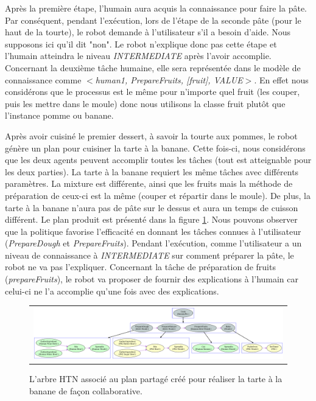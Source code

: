 \documentclass[a4paper,11pt,twoside]{StyleThese}
\begin{document}
Après la première étape, l'humain aura acquis la connaissance pour faire la pâte. Par conséquent, pendant l'exécution, lors de l'étape de la seconde pâte (pour le haut de la tourte), le robot demande à l'utilisateur s'il a besoin d'aide. Nous supposons ici qu'il dit "non". Le robot n'explique donc pas cette étape et l'humain atteindra le niveau \textit{INTERMEDIATE} après l'avoir accomplie. Concernant la deuxième tâche humaine, elle sera représentée dans le modèle de connaissance comme \textit{$<$human1, PrepareFruits, [fruit], VALUE$>$}. En effet nous considérons que le processus est le même pour n'importe quel fruit (les couper, puis les mettre dans le moule) donc nous utilisons la classe fruit plutôt que l'instance pomme ou banane.
%
%

Après avoir cuisiné le premier dessert, à savoir la tourte aux pommes, le robot génère un plan pour cuisiner la tarte à la banane. Cette fois-ci, nous considérons que les deux agents peuvent accomplir toutes les tâches (tout est atteignable pour les deux parties). La tarte à la banane requiert les même tâches avec différents paramètres. La mixture est différente, ainsi que les fruits mais la méthode de préparation de ceux-ci est la même (couper et répartir dans le moule). De plus, la tarte à la banane n'aura pas de pâte sur le dessus et aura un temps de cuisson différent. Le plan produit est présenté dans la figure \ref{fig:bananaPlan}. Nous pouvons observer que la politique favorise l'efficacité en donnant les tâches connues à l'utilisateur (\textit{PrepareDough} et \textit{PrepareFruits}). Pendant l'exécution, comme l'utilisateur a un niveau de connaissance à \textit{INTERMEDIATE} sur comment préparer la pâte, le robot ne va pas l'expliquer. Concernant la tâche de préparation de fruits (\textit{prepareFruits}), le robot va proposer de fournir des explications à l'humain car celui-ci ne l'a accomplie qu'une fois avec des explications.


\clearpage

\begin{figure}
 \centering
 \begin{tabular}{c}
  \includegraphics[width=1.0\textwidth]{img/bananaPie.pdf}
 \end{tabular}
 \caption{L'arbre HTN associé au plan partagé créé pour réaliser la tarte à la banane de façon collaborative.}
 \label{fig:bananaPlan}
\end{figure}
\end{document}
